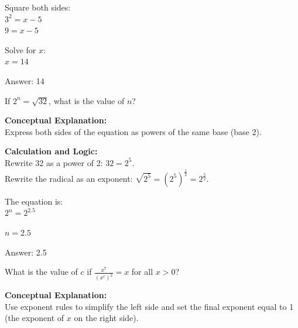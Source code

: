 \documentclass[11pt,paper=a4,answers]{exam}
\begin{document}
\begin{questions}
\begin{solution}
\vspace{10pt}

Square both sides: \\
$3^2 = x - 5$ \\
$9 = x - 5$

\vspace{10pt}

Solve for $x$: \\
$x = 14$

\vspace{25pt}

Answer: \colorbox{yellow!100}{14}
\end{solution}

\vspace{40pt}

\question
If $2^n = \sqrt{32}$, what is the value of $n$?

\begin{solution}
\textbf{Conceptual Explanation:} \\
Express both sides of the equation as powers of the same base (base 2).

\vspace{20pt}

\textbf{Calculation and Logic:} \\
Rewrite 32 as a power of 2: $32 = 2^5$. \\
Rewrite the radical as an exponent: $\sqrt{2^5} = (2^5)^{\frac{1}{2}} = 2^{\frac{5}{2}}$.

\vspace{10pt}

The equation is: \\
$2^n = 2^{2.5}$

\vspace{10pt}

$n = 2.5$

\vspace{25pt}

Answer: \colorbox{yellow!100}{2.5}
\end{solution}

\vspace{40pt}

\question
What is the value of $c$ if $\frac{x^7}{(x^c)^2} = x$ for all $x > 0$?

\begin{solution}
\textbf{Conceptual Explanation:} \\
Use exponent rules to simplify the left side and set the final exponent equal to 1 (the exponent of $x$ on the right side).


\end{solution}
\end{questions}
\end{document}
